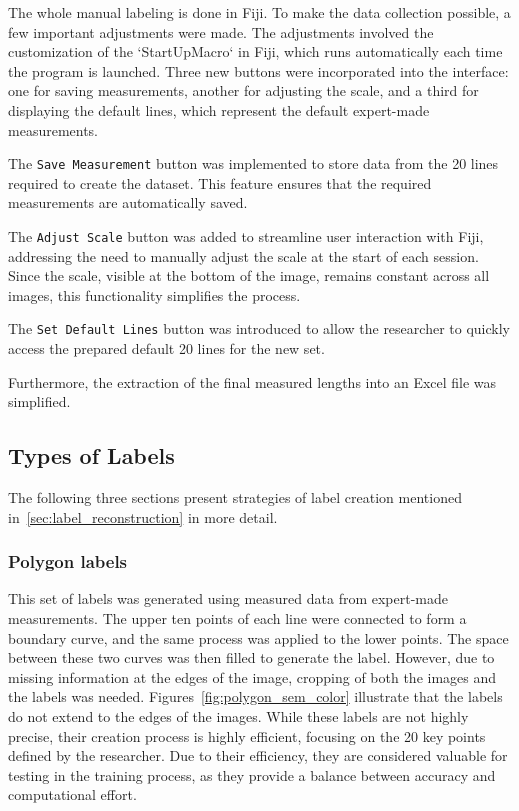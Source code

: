 The whole manual labeling is done in Fiji. To make the data collection possible, a few important adjustments were made. The adjustments involved the customization of the `StartUpMacro` in Fiji, which runs automatically each time the program is launched. Three new buttons were incorporated into the interface: one for saving measurements, another for adjusting the scale, and a third for displaying the default lines, which represent the default expert-made measurements.

The \texttt{Save Measurement} button was implemented to store data from the 20 lines required to create the dataset. This feature ensures that the required measurements are automatically saved.

The \texttt{Adjust Scale} button was added to streamline user interaction with Fiji, addressing the need to manually adjust the scale at the start of each session. Since the scale, visible at the bottom of the image, remains constant across all images, this functionality simplifies the process.

The \texttt{Set Default Lines} button was introduced to allow the researcher to quickly access the prepared default 20 lines for the new set.

Furthermore, the extraction of the final measured lengths into an Excel file was simplified.

\subsection{Types of Labels}\label{sec:masks}


The following three sections present strategies of label creation mentioned in~\ref{sec:label_reconstruction} in more detail.



\subsubsection{Polygon labels}

This set of labels was generated using measured data from expert-made measurements. The upper ten points of each line were connected to form a boundary curve, and the same process was applied to the lower points. The space between these two curves was then filled to generate the label. However, due to missing information at the edges of the image, cropping of both the images and the labels was needed. Figures~\ref{fig:polygon_sem_color} illustrate that the labels do not extend to the edges of the images. While these labels are not highly precise, their creation process is highly efficient, focusing on the 20 key points defined by the researcher. Due to their efficiency, they are considered valuable for testing in the training process, as they provide a balance between accuracy and computational effort.



